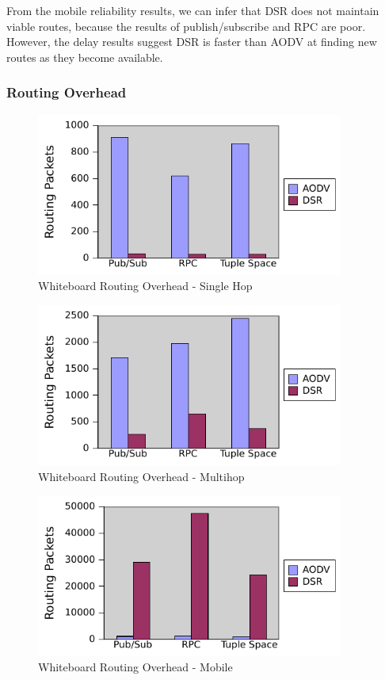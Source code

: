 From the mobile reliability results, we can infer that DSR does not maintain viable routes, because the results of publish/subscribe and RPC are poor. However, the delay results suggest DSR is faster than AODV at finding new routes as they become available.


\subsubsection{Routing Overhead}\label{sec:routing}

\begin{figure}
\centering
\includegraphics[width = 0.9\textwidth]{figures/single-hop-routing.pdf}
\caption{Whiteboard Routing Overhead - Single Hop}
\label{fig:wbrouting-sh}
\end{figure}

\begin{figure}
\centering
\includegraphics[width = 0.9\textwidth]{figures/multi-hop-routing.pdf}
\caption{Whiteboard Routing Overhead - Multihop}
\label{fig:wbrouting-mh}
\end{figure}

\begin{figure}
\centering
\includegraphics[width = 0.9\textwidth]{figures/mobile-routing.pdf}
\caption{Whiteboard Routing Overhead - Mobile}
\label{fig:wbrouting-m}
\end{figure}


